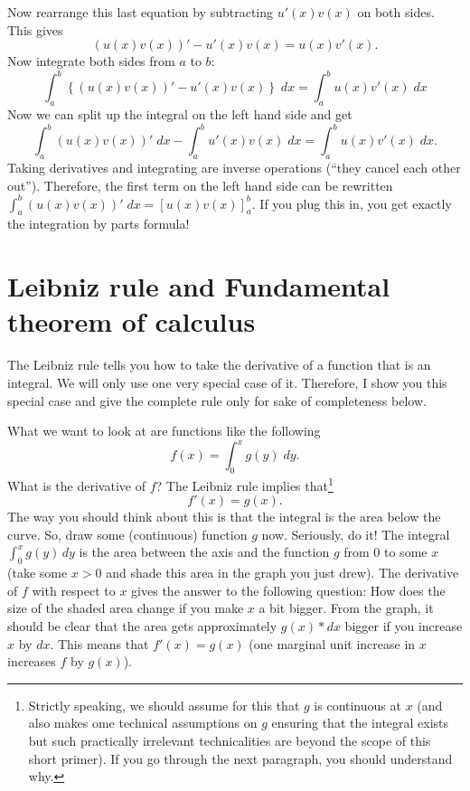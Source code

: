 \documentclass[a4paper,12pt]{article}
\theoremstyle{plain}
\begin{document}
Now rearrange this last equation by subtracting $u'(x)v(x)$ on both sides. This gives
\begin{equation*}
  \left(u(x) v(x)\right)'-u'(x)v(x)=u(x)v'(x).
\end{equation*}
Now integrate both sides from $a$ to $b$:
\begin{equation*}
  \int_a^b\left\{(u(x) v(x))'-u'(x)v(x)\right\}\;dx=\int_a^bu(x)v'(x)\;dx
\end{equation*}
Now we can split up the integral on the left hand side and get
\begin{equation*}
  \int_a^b\left(u(x) v(x)\right)' \;dx-\int_a^bu'(x)v(x)\;dx=\int_a^bu(x)v'(x)\;dx.
\end{equation*}
Taking derivatives and integrating are inverse operations (``they cancel each other out''). Therefore, the first term on the left hand side can be rewritten $\int_a^b\left(u(x) v(x)\right)' \;dx=\left[ u(x) v(x)\right]_a^b$. If you plug this in, you get exactly the integration by parts formula!



\section{Leibniz rule and Fundamental theorem of calculus}
\label{sec:leibniz-rule}

The Leibniz rule tells you how to take the derivative of a function that is an integral. We will only use one very special case of it. Therefore, I show you this special case and give the complete rule only for sake of completeness below.

What we want to look at are functions like the following
$$f(x)=\int_0^x g(y) \;dy.$$
What is the derivative of $f$? The Leibniz rule implies that\footnote{Strictly speaking, we should assume for this that $g$ is continuous at $x$ (and also makes ome technical assumptions on $g$ ensuring that the integral exists but such practically irrelevant technicalities are beyond the scope of this short primer). If you go through the next paragraph, you should understand why.}
$$f'(x)=g(x).$$
The way you should think about this is that the integral is the area below the curve. So, draw some (continuous) function $g$ now. Seriously, do it! The integral $\int_0^xg(y)\, dy$ is the area between the axis and the function $g$ from $0$ to some $x$ (take some $x>0$ and shade this area in the graph you just drew). The derivative of $f$ with respect to $x$ gives the answer to the following question: How does the size of the shaded area change if you make $x$ a bit bigger. From the graph, it should be clear that the area gets approximately $g(x)*dx$ bigger if you increase $x$ by $dx$. This means that $f'(x)=g(x)$ (one marginal unit increase in $x$ increases $f$ by $g(x)$).
\end{document}
